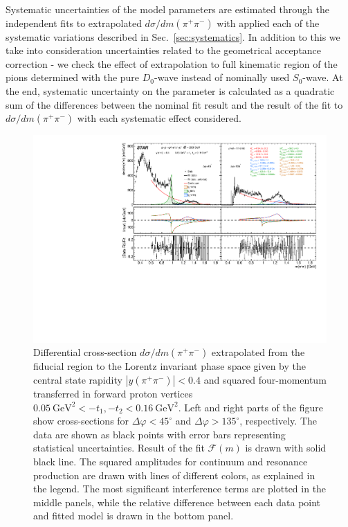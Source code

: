 Systematic uncertainties of the model parameters are estimated through the independent fits to extrapolated $d\sigma/dm(\pi^{+}\pi^{-})$ with applied each of the systematic variations described in Sec.~\ref{sec:systematics}. In addition to this we take into consideration uncertainties related to the geometrical acceptance correction - we check the effect of extrapolation to full kinematic region of the pions determined with the pure $D_{0}$-wave instead of nominally used $S_{0}$-wave. At the end, systematic uncertainty on the parameter is calculated as a quadratic sum of the differences between the nominal fit result and the result of the fit to $d\sigma/dm(\pi^{+}\pi^{-})$ with each systematic effect considered.

\begin{figure}%
\centering
\includegraphics[width=\textwidth,page=1]{graphics/physicsResults/InvMassFit/RatioAndInterference_PiPiInvMass_Fit.pdf}
%
\caption[Differential cross-section $d\sigma/dm(\pi^{+}\pi^{-})$ extrapolated from the fiducial region to the Lorentz invariant phase space given by the central state rapidity $|y(\pi^{+}\pi^{-})|<0.4$ and squared four-momentum transferred in forward proton vertices $0.05~\text{GeV}^{2} < -t_{1}, -t_{2} < 0.16~\text{GeV}^{2}$]{Differential cross-section $d\sigma/dm(\pi^{+}\pi^{-})$ extrapolated from the fiducial region to the Lorentz invariant phase space given by the central state rapidity $|y(\pi^{+}\pi^{-})|<0.4$ and squared four-momentum transferred in forward proton vertices $0.05~\text{GeV}^{2} < -t_{1}, -t_{2} < 0.16~\text{GeV}^{2}$. Left and right parts of the figure show cross-sections for $\Delta\varphi<45^\circ$ and $\Delta\varphi>135^\circ$, respectively. The data are shown as black points with error bars representing statistical uncertainties. Result of the fit $\mathcal{F}(m)$ is drawn with solid black line. The squared amplitudes for continuum and resonance production are drawn with lines of different colors, as explained in the legend. The most significant interference terms are plotted in the middle panels, while the relative difference between each data point and fitted model is drawn in the bottom panel.}
\label{invMassFit}
\end{figure}

